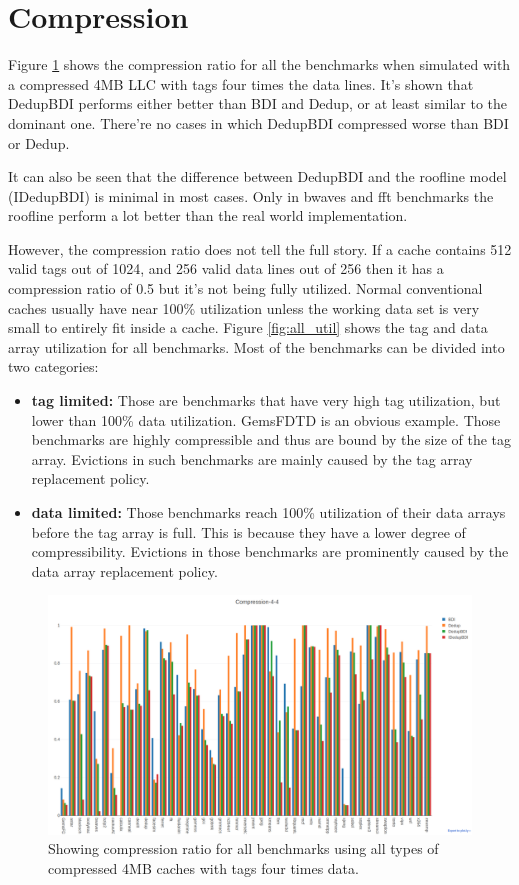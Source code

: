 \section{Compression}
\label{sec:Compression}
Figure \ref{fig:all_compratio} shows the compression ratio for all the benchmarks when simulated with a compressed 4MB LLC with tags four times the data lines. It's shown that DedupBDI performs either better than BDI and Dedup, or at least similar to the dominant one. There're no cases in which DedupBDI compressed worse than BDI or Dedup.\par
It can also be seen that the difference between DedupBDI and the roofline model (IDedupBDI) is minimal in most cases. Only in bwaves and fft benchmarks the roofline perform a lot better than the real world implementation.\par
However, the compression ratio does not tell the full story. If a cache contains 512 valid tags out of 1024, and 256 valid data lines out of 256 then it has a compression ratio of 0.5 but it's not being fully utilized. Normal conventional caches usually have near 100\% utilization unless the working data set is very small to entirely fit inside a cache. Figure \ref{fig:all_util} shows the tag and data array utilization for all benchmarks. Most of the benchmarks can be divided into two categories:
\begin{itemize}
    \item \textbf{tag limited:} Those are benchmarks that have very high tag utilization, but lower than 100\% data utilization. GemsFDTD is an obvious example. Those benchmarks are highly compressible and thus are bound by the size of the tag array. Evictions in such benchmarks are mainly caused by the tag array replacement policy.
    \item \textbf{data limited:} Those benchmarks reach 100\% utilization of their data arrays before the tag array is full. This is because they have a lower degree of compressibility. Evictions in those benchmarks are prominently caused by the data array replacement policy.
\end{itemize}
\begin{figure}
    \includegraphics[width=\textwidth]{all-compratio.png}
    \caption[All benchmarks: Compression]{Showing compression ratio for all benchmarks using all types of compressed 4MB caches with tags four times data.}
    \label{fig:all_compratio}
\end{figure}
